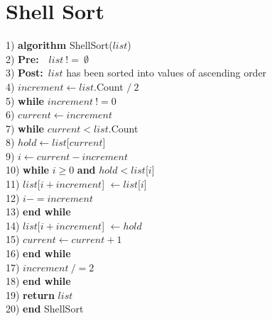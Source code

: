 \section{Shell Sort}
\begin{tabbing}
1)  \textbf{alg}\= \textbf{orithm} ShellSort($list$) \\
2)  \> \textbf{Pre:}~~$list~!=~\emptyset$ \\
3)  \> \textbf{Post:}~$list$ has been sorted into values of ascending order \\
4)  \> $increment \leftarrow list$.Count $/~2$ \\
5)  \> \textbf{whi}\= \textbf{le} $increment~!= 0$ \\
6)  \> \> $current \leftarrow increment$ \\
7)  \> \> \textbf{whi}\= \textbf{le} $current < list$.Count \\
8)  \> \> \> $hold \leftarrow list$[$current$] \\
9)  \> \> \> $i \leftarrow current - increment$ \\
10) \> \> \> \textbf{whi}\= \textbf{le} $i \geq 0$ \textbf{and} $hold < list$[$i$] \\
11) \> \> \> \> $list$[$i + increment$] $\leftarrow list$[$i$] \\
12) \> \> \> \> $i -= increment$ \\
13) \> \> \> \textbf{end while} \\
14) \> \> \> $list$[$i + increment$] $\leftarrow hold$ \\
15) \> \> \> $current \leftarrow current + 1$ \\
16) \> \> \textbf{end while} \\
17) \> \> $increment~/= 2$ \\
18) \> \textbf{end while} \\
19) \> \textbf{return} $list$ \\
20) \textbf{end} ShellSort \\
\end{tabbing}
